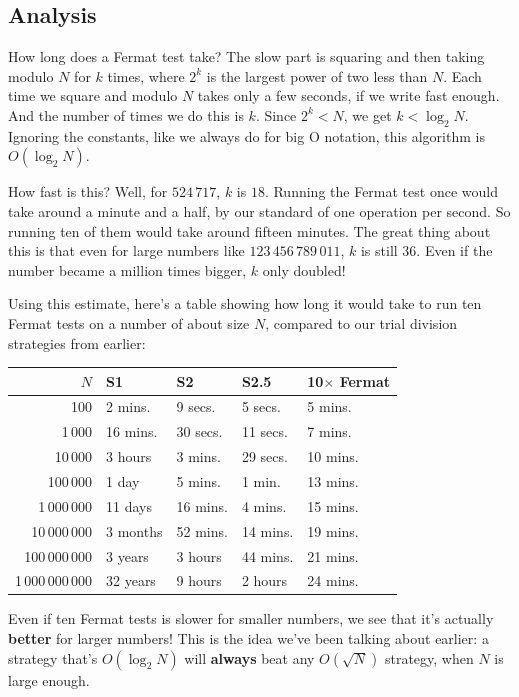 \documentclass[11pt,paper=letter]{scrartcl}
\begin{document}
\subsection{Analysis}

How long does a Fermat test take? The slow part is squaring and then taking modulo $N$ for $k$ times, where $2^k$ is the largest power of two less than $N$. Each time we square and modulo $N$ takes only a few seconds, if we write fast enough. And the number of times we do this is $k$. Since $2^k < N$, we get $k < \log_2 N$. Ignoring the constants, like we always do for big O notation, this algorithm is $O(\log_2 N)$.

How fast is this? Well, for $524\,717$, $k$ is $18$. Running the Fermat test once would take around a minute and a half, by our standard of one operation per second. So running ten of them would take around fifteen minutes. The great thing about this is that even for large numbers like $123\,456\,789\,011$, $k$ is still $36$. Even if the number became a million times bigger, $k$ only doubled!

Using this estimate, here's a table showing how long it would take to run ten Fermat tests on a number of about size $N$, compared to our trial division strategies from earlier:
\begin{center}
\begin{tabular}{rllll}
$N$              & S1       & S2       & S2.5     & 10$\times$ Fermat \\ \hline
100              & 2 mins.  & 9 secs.  & 5 secs.  & 5 mins. \\
1\,000           & 16 mins. & 30 secs. & 11 secs. & 7 mins. \\
10\,000          & 3 hours  & 3 mins.  & 29 secs. & 10 mins. \\
100\,000         & 1 day    & 5 mins.  & 1 min.   & 13 mins. \\
1\,000\,000      & 11 days  & 16 mins. & 4 mins.  & 15 mins. \\
10\,000\,000     & 3 months & 52 mins. & 14 mins. & 19 mins. \\
100\,000\,000    & 3 years  & 3 hours  & 44 mins. & 21 mins. \\
1\,000\,000\,000 & 32 years & 9 hours  & 2 hours  & 24 mins.
\end{tabular}
\end{center}
Even if ten Fermat tests is slower for smaller numbers, we see that it's actually \textbf{better} for larger numbers! This is the idea we've been talking about earlier: a strategy that's $O(\log_2 N)$ will \textbf{always} beat any $O(\sqrt N)$ strategy, when $N$ is large enough.
\end{document}
